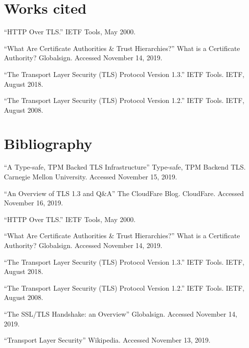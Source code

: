 \documentclass[12pt]{article}
\begin{document}
\newpage

\section{Works cited}
\begin{description}[leftmargin=!,itemindent=-15pt]
    \item ``HTTP Over TLS.'' IETF Tools, May 2000. %
    \item ``What Are Certificate Authorities \& Trust Hierarchies?'' What is a Certificate Authority? Globalsign. Accessed November 14, 2019. %
    \item ``The Transport Layer Security (TLS) Protocol Version 1.3.'' IETF Tools. IETF, August 2018. %
    \item ``The Transport Layer Security (TLS) Protocol Version 1.2.'' IETF Tools. IETF, August 2008. %
\end{description}

\newpage

\section{Bibliography}

\begin{description}[leftmargin=!,itemindent=-15pt]
    \item ``A Type-safe, TPM Backed TLS Infrastructure'' Type-safe, TPM Backend TLS. Carnegie Mellon University. Accessed November 15, 2019.
    \item ``An Overview of TLS 1.3 and Q\&A'' The CloudFare Blog. CloudFare. Accessed November 16, 2019. %
    \item ``HTTP Over TLS.'' IETF Tools, May 2000. %
    \item ``What Are Certificate Authorities \& Trust Hierarchies?'' What is a Certificate Authority? Globalsign. Accessed November 14, 2019. %
    \item ``The Transport Layer Security (TLS) Protocol Version 1.3.'' IETF Tools. IETF, August 2018. %
    \item ``The Transport Layer Security (TLS) Protocol Version 1.2.'' IETF Tools. IETF, August 2008. %
    \item ``The SSL/TLS Handshake: an Overview'' Globalsign. Accessed November 14, 2019. %
    \item ``Transport Layer Security'' Wikipedia. Accessed November 13, 2019. 
\end{description}

\end{document}
